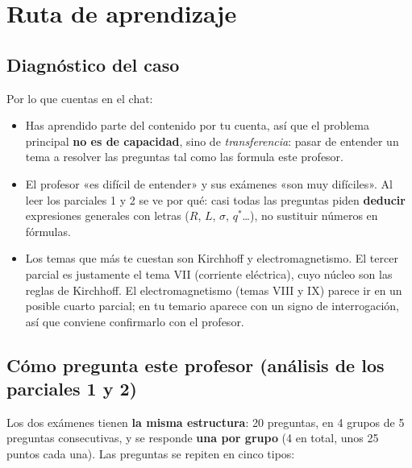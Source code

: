 \documentclass[11pt]{article}
\begin{document}
\tableofcontents
\newpage

\section{Ruta de aprendizaje}

\subsection{Diagnóstico del caso}
Por lo que cuentas en el chat:
\begin{itemize}
\item Has aprendido parte del contenido por tu cuenta, así que el problema principal \textbf{no es de capacidad}, sino de \emph{transferencia}: pasar de entender un tema a resolver las preguntas tal como las formula este profesor.
\item El profesor «es difícil de entender» y sus exámenes «son muy difíciles». Al leer los parciales 1 y 2 se ve por qué: casi todas las preguntas piden \textbf{deducir} expresiones generales con letras ($R$, $L$, $\sigma$, $q^*$\dots), no sustituir números en fórmulas.
\item Los temas que más te cuestan son Kirchhoff y electromagnetismo. El tercer parcial es justamente el tema VII (corriente eléctrica), cuyo núcleo son las reglas de Kirchhoff. El electromagnetismo (temas VIII y IX) parece ir en un posible cuarto parcial; en tu temario aparece con un signo de interrogación, así que conviene confirmarlo con el profesor.
\end{itemize}

\subsection{Cómo pregunta este profesor (análisis de los parciales 1 y 2)}
Los dos exámenes tienen \textbf{la misma estructura}: 20 preguntas, en 4 grupos de 5 preguntas consecutivas, y se responde \textbf{una por grupo} (4 en total, unos 25 puntos cada una). Las preguntas se repiten en cinco tipos:
\end{document}
